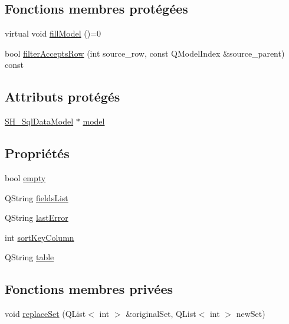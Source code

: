 \subsection*{Fonctions membres protégées}
\begin{DoxyCompactItemize}
\item 
virtual void \hyperlink{classSH__ExtendedProxyModel_ad6b7ea810aa00f42624253d77caafcbb}{fill\-Model} ()=0
\item 
bool \hyperlink{classSH__ExtendedProxyModel_a1eda169699702a7bfed4dfa8718c0b86}{filter\-Accepts\-Row} (int source\-\_\-row, const Q\-Model\-Index \&source\-\_\-parent) const 
\end{DoxyCompactItemize}
\subsection*{Attributs protégés}
\begin{DoxyCompactItemize}
\item 
\hyperlink{classSH__SqlDataModel}{S\-H\-\_\-\-Sql\-Data\-Model} $\ast$ \hyperlink{classSH__ExtendedProxyModel_a8c8b8930c6b1abd9bbb1dce1fdc9690b}{model}
\end{DoxyCompactItemize}
\subsection*{Propriétés}
\begin{DoxyCompactItemize}
\item 
bool \hyperlink{classSH__ExtendedProxyModel_a9e22d17af7776aca8052084cc33c3442}{empty}
\item 
Q\-String \hyperlink{classSH__ExtendedProxyModel_a15e779ba92384a57442d6bd79ef3d1d1}{fields\-List}
\item 
Q\-String \hyperlink{classSH__ExtendedProxyModel_a287d34971582bbe68a7f1f0826165de5}{last\-Error}
\item 
int \hyperlink{classSH__ExtendedProxyModel_a47e2d0b99b84fb066438db667dd1ad26}{sort\-Key\-Column}
\item 
Q\-String \hyperlink{classSH__ExtendedProxyModel_a7eef4557a77444e9ce5c24c180392bfa}{table}
\end{DoxyCompactItemize}
\subsection*{Fonctions membres privées}
\begin{DoxyCompactItemize}
\item 
void \hyperlink{classSH__ExtendedProxyModel_abb0f0b100df006c1c2646833a444b734}{replace\-Set} (Q\-List$<$ int $>$ \&original\-Set, Q\-List$<$ int $>$ new\-Set)
\end{DoxyCompactItemize}

